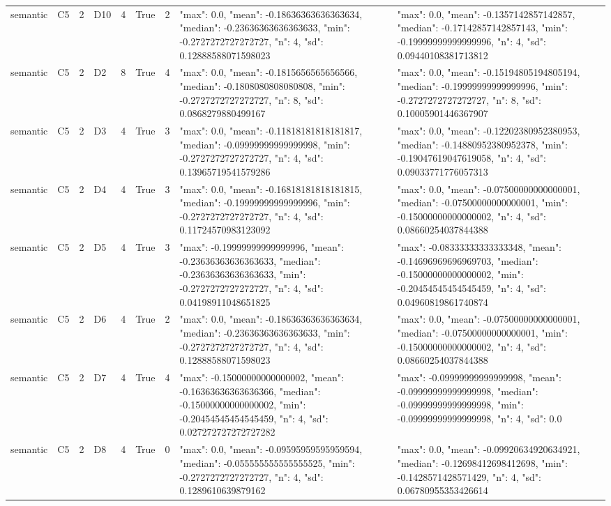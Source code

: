 \begin{tabular}{lllllllll}
semantic & C5 & 2 & D10 & 4 & True & 2 & {"max": 0.0, "mean": -0.18636363636363634, "median": -0.23636363636363633, "min": -0.2727272727272727, "n": 4, "sd": 0.12888588071598023} & {"max": 0.0, "mean": -0.1357142857142857, "median": -0.17142857142857143, "min": -0.19999999999999996, "n": 4, "sd": 0.09440108381713812} \\
semantic & C5 & 2 & D2 & 8 & True & 4 & {"max": 0.0, "mean": -0.1815656565656566, "median": -0.1808080808080808, "min": -0.2727272727272727, "n": 8, "sd": 0.0868279880499167} & {"max": 0.0, "mean": -0.15194805194805194, "median": -0.19999999999999996, "min": -0.2727272727272727, "n": 8, "sd": 0.10005901446367907} \\
semantic & C5 & 2 & D3 & 4 & True & 3 & {"max": 0.0, "mean": -0.11818181818181817, "median": -0.09999999999999998, "min": -0.2727272727272727, "n": 4, "sd": 0.13965719541579286} & {"max": 0.0, "mean": -0.12202380952380953, "median": -0.14880952380952378, "min": -0.19047619047619058, "n": 4, "sd": 0.09033771776057313} \\
semantic & C5 & 2 & D4 & 4 & True & 3 & {"max": 0.0, "mean": -0.16818181818181815, "median": -0.19999999999999996, "min": -0.2727272727272727, "n": 4, "sd": 0.11724570983123092} & {"max": 0.0, "mean": -0.07500000000000001, "median": -0.07500000000000001, "min": -0.15000000000000002, "n": 4, "sd": 0.08660254037844388} \\
semantic & C5 & 2 & D5 & 4 & True & 3 & {"max": -0.19999999999999996, "mean": -0.23636363636363633, "median": -0.23636363636363633, "min": -0.2727272727272727, "n": 4, "sd": 0.04198911048651825} & {"max": -0.08333333333333348, "mean": -0.14696969696969703, "median": -0.15000000000000002, "min": -0.20454545454545459, "n": 4, "sd": 0.04960819861740874} \\
semantic & C5 & 2 & D6 & 4 & True & 2 & {"max": 0.0, "mean": -0.18636363636363634, "median": -0.23636363636363633, "min": -0.2727272727272727, "n": 4, "sd": 0.12888588071598023} & {"max": 0.0, "mean": -0.07500000000000001, "median": -0.07500000000000001, "min": -0.15000000000000002, "n": 4, "sd": 0.08660254037844388} \\
semantic & C5 & 2 & D7 & 4 & True & 4 & {"max": -0.15000000000000002, "mean": -0.16363636363636366, "median": -0.15000000000000002, "min": -0.20454545454545459, "n": 4, "sd": 0.027272727272727282} & {"max": -0.09999999999999998, "mean": -0.09999999999999998, "median": -0.09999999999999998, "min": -0.09999999999999998, "n": 4, "sd": 0.0} \\
semantic & C5 & 2 & D8 & 4 & True & 0 & {"max": 0.0, "mean": -0.09595959595959594, "median": -0.055555555555555525, "min": -0.2727272727272727, "n": 4, "sd": 0.1289610639879162} & {"max": 0.0, "mean": -0.09920634920634921, "median": -0.12698412698412698, "min": -0.1428571428571429, "n": 4, "sd": 0.06780955353426614} \\

\end{tabular}
